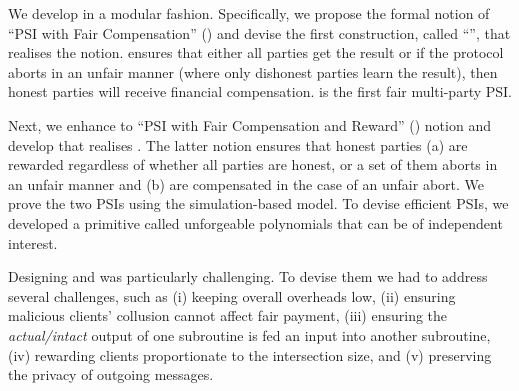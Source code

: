 


We develop \withRew in a modular fashion. Specifically, we propose the formal notion of ``PSI with Fair Compensation'' (\p) and devise the first construction, called ``\withFai'', that realises the notion. 
%
%
 \p ensures that either all parties get the result or if the protocol aborts in an unfair manner (where only dishonest parties learn the result), then honest parties will receive financial compensation. \withFai is the first fair multi-party PSI. %



Next, we enhance \p to ``PSI with Fair Compensation and Reward'' (\ep) notion and develop \withRew that realises \ep. The latter notion ensures that honest parties (a) are rewarded regardless of whether all parties are honest, or a set of them aborts in an unfair manner and (b) are compensated in the case of an unfair abort. We prove the two PSIs using the simulation-based model. To devise efficient PSIs, we  developed a primitive called unforgeable polynomials that can be of independent interest. 


Designing \withFai and \withRew was particularly challenging. To devise them we had to address several challenges, such as (i) keeping overall overheads low, (ii) ensuring malicious clients’ collusion cannot affect fair payment, (iii) ensuring the \emph{actual/intact} output of one subroutine is fed an input into another subroutine,  (iv) rewarding clients proportionate to the intersection size, and (v) preserving the privacy of outgoing messages. 


